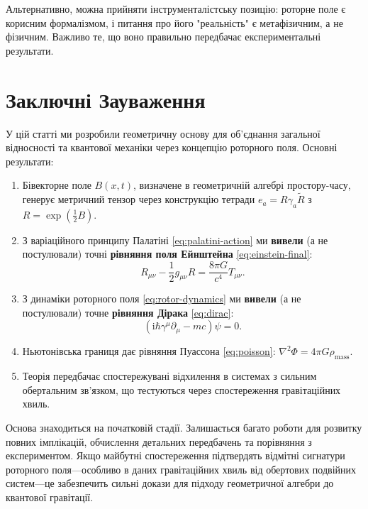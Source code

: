 \documentclass[11pt,a4paper]{article}
\numberwithin{equation}{section}
\theoremstyle{plain}
\theoremstyle{definition}
\theoremstyle{remark}
\newcommand{\ii}{\mathrm{i}}
\begin{document}
Альтернативно, можна прийняти інструменталістську позицію: роторне поле є корисним формалізмом, і питання про його "реальність" є метафізичним, а не фізичним. Важливо те, що воно правильно передбачає експериментальні результати.

\section{Заключні Зауваження}
\label{sec:conclusion}

У цій статті ми розробили геометричну основу для об'єднання загальної відносності та квантової механіки через концепцію роторного поля. Основні результати:

\begin{enumerate}
  \item Бівекторне поле $B(x,t)$, визначене в геометричній алгебрі простору-часу, генерує метричний тензор через конструкцію тетради $e_a = R\gamma_a\widetilde{R}$ з $R = \exp(\frac{1}{2}B)$.
  \item З варіаційного принципу Палатіні \eqref{eq:palatini-action} ми \textbf{вивели} (а не постулювали) точні \textbf{рівняння поля Ейнштейна} \eqref{eq:einstein-final}:
  \begin{equation*}
  R_{\mu\nu} - \frac{1}{2}g_{\mu\nu}R = \frac{8\pi G}{c^4} T_{\mu\nu}.
  \end{equation*}
  \item З динаміки роторного поля \eqref{eq:rotor-dynamics} ми \textbf{вивели} (а не постулювали) точне \textbf{рівняння Дірака} \eqref{eq:dirac}:
  \begin{equation*}
  (\ii\hbar\gamma^\mu \partial_\mu - mc)\psi = 0.
  \end{equation*}
  \item Ньютонівська границя дає рівняння Пуассона \eqref{eq:poisson}: $\nabla^2\Phi = 4\pi G\rho_{\mathrm{mass}}$.
  \item Теорія передбачає спостережувані відхилення в системах з сильним обертальним зв'язком, що тестуються через спостереження гравітаційних хвиль.
\end{enumerate}

Основа знаходиться на початковій стадії. Залишається багато роботи для розвитку повних імплікацій, обчислення детальних передбачень та порівняння з експериментом. Якщо майбутні спостереження підтвердять відмітні сигнатури роторного поля---особливо в даних гравітаційних хвиль від обертових подвійних систем---це забезпечить сильні докази для підходу геометричної алгебри до квантової гравітації.
\end{document}
